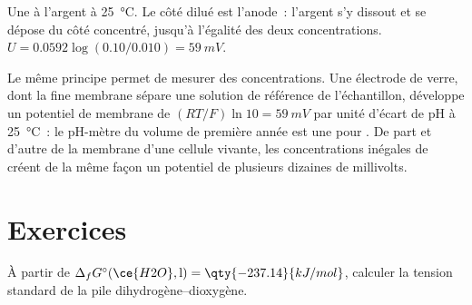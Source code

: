 \begin{omfigure}

{\small Une  à l'argent à \qty{25}{\degreeCelsius}. Le côté dilué est
l'anode~: l'argent s'y dissout et se dépose du côté concentré,
jusqu'à l'égalité des deux concentrations. $U = 0.0592\log(0.10/0.010) =
\qty{59}{mV}$.}
\end{omfigure}

Le même principe permet de mesurer des concentrations. Une électrode de verre, dont la fine
membrane sépare une solution de référence de l'échantillon, développe un potentiel de
membrane de $(RT/F)\ln 10 = \qty{59}{mV}$ par unité d'écart de pH à
\qty{25}{\degreeCelsius}~: le pH-mètre du volume de première année est une 
pour . De part et d'autre de la membrane d'une cellule vivante, les concentrations inégales
de  créent de la même façon un potentiel de plusieurs dizaines de millivolts.

\section{Exercices}

\begin{exercise}[$\star$]\label{exo:b2:cell-thermodynamics:1}
À partir de $\Delta_f G^\circ(\ce{H2O}, \text{l}) = \qty{-237.14}{kJ/mol}$, calculer la
tension standard de la pile dihydrogène--dioxygène.
\end{exercise}

